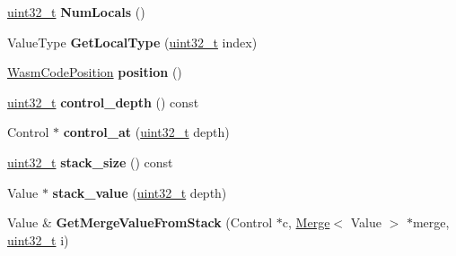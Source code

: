 \begin{DoxyCompactItemize}
\item 
\mbox{\label{classv8_1_1internal_1_1wasm_1_1WasmFullDecoder_a67969357736ecd0f74b593bc42618a66}} 
\mbox{\hyperlink{classuint32__t}{uint32\+\_\+t}} {\bfseries Num\+Locals} ()
\item 
\mbox{\label{classv8_1_1internal_1_1wasm_1_1WasmFullDecoder_a2da470f81645365c7f0684e519dfeb56}} 
Value\+Type {\bfseries Get\+Local\+Type} (\mbox{\hyperlink{classuint32__t}{uint32\+\_\+t}} index)
\item 
\mbox{\label{classv8_1_1internal_1_1wasm_1_1WasmFullDecoder_ada51705cf94c18c2fb1dc1598087f9c6}} 
\mbox{\hyperlink{classint}{Wasm\+Code\+Position}} {\bfseries position} ()
\item 
\mbox{\label{classv8_1_1internal_1_1wasm_1_1WasmFullDecoder_aa5ac176e3d483300972a59f13050b3ad}} 
\mbox{\hyperlink{classuint32__t}{uint32\+\_\+t}} {\bfseries control\+\_\+depth} () const
\item 
\mbox{\label{classv8_1_1internal_1_1wasm_1_1WasmFullDecoder_a6e7d8aaa3d56f0c0240d49ed4e29986b}} 
Control $\ast$ {\bfseries control\+\_\+at} (\mbox{\hyperlink{classuint32__t}{uint32\+\_\+t}} depth)
\item 
\mbox{\label{classv8_1_1internal_1_1wasm_1_1WasmFullDecoder_af18d6e0b67e7861fa110f1283ef7b9e8}} 
\mbox{\hyperlink{classuint32__t}{uint32\+\_\+t}} {\bfseries stack\+\_\+size} () const
\item 
\mbox{\label{classv8_1_1internal_1_1wasm_1_1WasmFullDecoder_a5c467a1dfc1f0434f2f38f9497b5b13c}} 
Value $\ast$ {\bfseries stack\+\_\+value} (\mbox{\hyperlink{classuint32__t}{uint32\+\_\+t}} depth)
\item 
\mbox{\label{classv8_1_1internal_1_1wasm_1_1WasmFullDecoder_abd5e81900a4c508274b8c0592370eff2}} 
Value \& {\bfseries Get\+Merge\+Value\+From\+Stack} (Control $\ast$c, \mbox{\hyperlink{structv8_1_1internal_1_1wasm_1_1Merge}{Merge}}$<$ Value $>$ $\ast$merge, \mbox{\hyperlink{classuint32__t}{uint32\+\_\+t}} i)
\end{DoxyCompactItemize}
